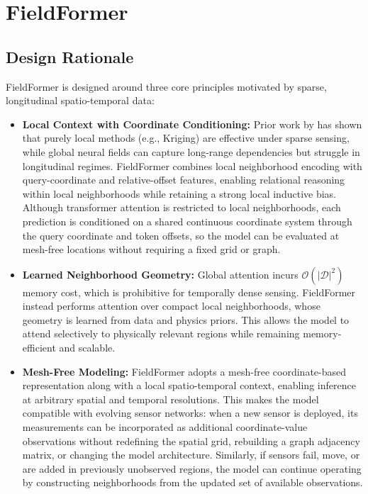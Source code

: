 \section{FieldFormer}
\label{sec:method}
\subsection{Design Rationale}
FieldFormer is designed around three core principles motivated by sparse, longitudinal spatio-temporal data:

\begin{itemize}[leftmargin=*,topsep=0pt]
    \item \textbf{Local Context with Coordinate Conditioning:}
    Prior work by \citet{bhardwaj2025comprehensive} has shown that purely local methods (e.g., Kriging) are effective under sparse sensing, while global neural fields can capture long-range dependencies but struggle in longitudinal regimes. FieldFormer combines local neighborhood encoding with query-coordinate and relative-offset features, enabling relational reasoning within local neighborhoods while retaining a strong local inductive bias. Although transformer attention is restricted to local neighborhoods, each prediction is conditioned on a shared continuous coordinate system through the query coordinate and token offsets, so the model can be evaluated at mesh-free locations without requiring a fixed grid or graph.

    \item \textbf{Learned Neighborhood Geometry:}
    Global attention incurs $\mathcal{O}(|\mathcal{D}|^2)$ memory cost, which is prohibitive for temporally dense sensing. FieldFormer instead performs attention over compact local neighborhoods, whose geometry is learned from data and physics priors. This allows the model to attend selectively to physically relevant regions while remaining memory-efficient and scalable.

    \item \textbf{Mesh-Free Modeling:}
    FieldFormer adopts a mesh-free coordinate-based representation along with a local spatio-temporal context, enabling inference at arbitrary spatial and temporal resolutions. This makes the model compatible with evolving sensor networks: when a new sensor is deployed, its measurements can be incorporated as additional coordinate-value observations without redefining the spatial grid, rebuilding a graph adjacency matrix, or changing the model architecture. Similarly, if sensors fail, move, or are added in previously unobserved regions, the model can continue operating by constructing neighborhoods from the updated set of available observations.
\end{itemize}


